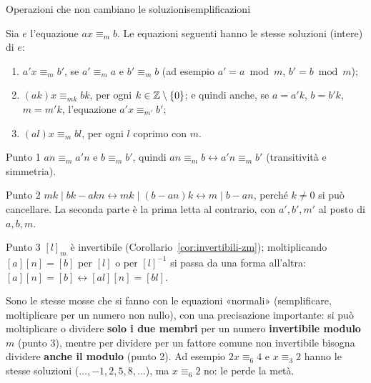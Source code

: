 \begin{concetto}
\begin{Proposizione}{Operazioni che non cambiano le soluzioni}{semplificazioni}
    \begin{prerequisiti}
    \end{prerequisiti}
    Sia $e$ l'equazione $ax \equiv_m b$. Le equazioni seguenti hanno le stesse soluzioni (intere) di $e$:
    \begin{enumerate}
        \item $a'x \equiv_m b'$, se $a' \equiv_m a$ e $b' \equiv_m b$ (ad esempio $a' = a \bmod m$, $b' = b \bmod m$);
        \item $(ak)x \equiv_{mk} bk$, per ogni $k \in \mathbb{Z} \setminus \{0\}$; e quindi anche, se $a = a'k$, $b = b'k$, $m = m'k$, l'equazione $a'x \equiv_{m'} b'$;
        \item $(al)x \equiv_m bl$, per ogni $l$ coprimo con $m$.
    \end{enumerate}
\end{Proposizione}
\begin{dimostrazione}
    \begin{caso}{Punto 1}
        $an \equiv_m a'n$ e $b \equiv_m b'$, quindi $an \equiv_m b \leftrightarrow a'n \equiv_m b'$ (transitività e simmetria).
    \end{caso}
    \begin{caso}{Punto 2}
        $mk \mid bk - akn \leftrightarrow mk \mid (b - an)k \leftrightarrow m \mid b - an$, perché $k \neq 0$ si può cancellare. La seconda parte è la prima
        letta al contrario, con $a', b', m'$ al posto di $a, b, m$.
    \end{caso}
    \begin{caso}{Punto 3}
        $[l]_m$ è invertibile (Corollario~\ref{cor:invertibili-zm}); moltiplicando $[a][n] = [b]$ per $[l]$ o per $[l]^{-1}$ si passa da una forma all'altra:
        $[a][n] = [b] \leftrightarrow [al][n] = [bl]$.
    \end{caso}
\end{dimostrazione}
\end{concetto}

\begin{spiegazione}
    Sono le stesse mosse che si fanno con le equazioni «normali» (semplificare, moltiplicare per un numero non nullo), con una
    precisazione importante: si può moltiplicare o dividere \textbf{solo i due membri} per un numero \textbf{invertibile modulo $m$}
    (punto 3), mentre per dividere per un fattore comune non invertibile bisogna dividere \textbf{anche il modulo} (punto 2). Ad
    esempio $2x \equiv_6 4$ e $x \equiv_3 2$ hanno le stesse soluzioni ($\dots, -1, 2, 5, 8, \dots$), ma $x \equiv_6 2$ no: le perde la metà.
\end{spiegazione}

